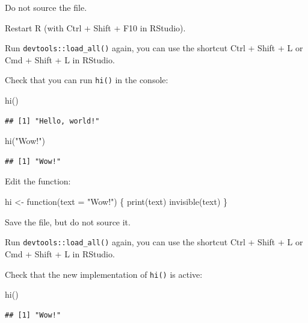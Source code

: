 \documentclass[]{book}
\newenvironment{Shaded}{}{}
\newcommand{\ControlFlowTok}[1]{\textcolor[rgb]{0.00,0.00,1.00}{#1}}
\newcommand{\DataTypeTok}[1]{#1}
\newcommand{\KeywordTok}[1]{\textcolor[rgb]{0.00,0.00,1.00}{#1}}
\newcommand{\NormalTok}[1]{#1}
\newcommand{\StringTok}[1]{\textcolor[rgb]{0.00,0.50,0.50}{#1}}
\begin{document}
Do not source the file.

Restart R (with Ctrl + Shift + F10 in RStudio).

Run \texttt{devtools::load\_all()} again, you can use the shortcut Ctrl + Shift + L or Cmd + Shift + L in RStudio.

Check that you can run \texttt{hi()} in the console:

\begin{Shaded}
\begin{Highlighting}[]
\KeywordTok{hi}\NormalTok{()}
\end{Highlighting}
\end{Shaded}

\begin{verbatim}
## [1] "Hello, world!"
\end{verbatim}

\begin{Shaded}
\begin{Highlighting}[]
\KeywordTok{hi}\NormalTok{(}\StringTok{"Wow!"}\NormalTok{)}
\end{Highlighting}
\end{Shaded}

\begin{verbatim}
## [1] "Wow!"
\end{verbatim}

Edit the function:

\begin{Shaded}
\begin{Highlighting}[]
\NormalTok{hi <-}\StringTok{ }\ControlFlowTok{function}\NormalTok{(}\DataTypeTok{text =} \StringTok{"Wow!"}\NormalTok{) \{}
  \KeywordTok{print}\NormalTok{(text)}
  \KeywordTok{invisible}\NormalTok{(text)}
\NormalTok{\}}
\end{Highlighting}
\end{Shaded}

Save the file, but do not source it.

Run \texttt{devtools::load\_all()} again, you can use the shortcut Ctrl + Shift + L or Cmd + Shift + L in RStudio.

Check that the new implementation of \texttt{hi()} is active:

\begin{Shaded}
\begin{Highlighting}[]
\KeywordTok{hi}\NormalTok{()}
\end{Highlighting}
\end{Shaded}

\begin{verbatim}
## [1] "Wow!"
\end{verbatim}
\end{document}

